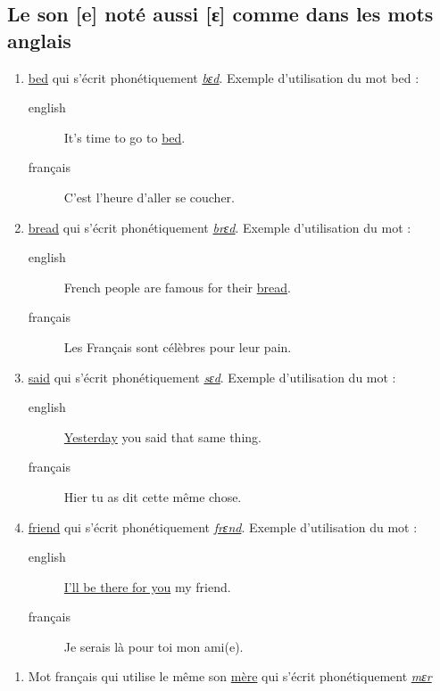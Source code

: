 \subsection{Le son [e] noté aussi [ɛ] comme dans les mots anglais}
\label{sec:orgd503395}
\begin{enumerate}
\item \href{http://www.wordreference.com/enfr/bed}{bed} qui s'écrit phonétiquement \href{https://en.oxforddictionaries.com/definition/bed}{\emph{bɛd}}. Exemple d'utilisation du mot bed :
\begin{description}
\item[{english}] \textenglish{It's time to go to \href{https://youtu.be/urARKkLo6MY}{bed}.}
\item[{français}] C'est l'heure d'aller se coucher.
\end{description}
\item \href{http://www.wordreference.com/enfr/bread}{bread} qui s'écrit phonétiquement \href{https://en.oxforddictionaries.com/definition/bread}{\emph{brɛd}}. Exemple d'utilisation du
mot :
\begin{description}
\item[{english}] \textenglish{French people are famous for their \href{https://youtu.be/Ynm9Wrznz4I}{bread}.}
\item[{français}] Les Français sont célèbres pour leur pain.
\end{description}
\item \href{http://www.wordreference.com/enfr/said}{said} qui s'écrit phonétiquement \href{https://en.oxforddictionaries.com/definition/said}{\emph{sɛd}}. Exemple d'utilisation du mot :
\begin{description}
\item[{english}] \textenglish{\href{https://www.azlyrics.com/lyrics/beatles/yesterday.html}{Yesterday} you said that same thing.}
\item[{français}] Hier tu as dit cette même chose.
\end{description}
\item \href{http://www.wordreference.com/enfr/friend}{friend} qui s'écrit phonétiquement \href{https://en.oxforddictionaries.com/definition/friend}{\emph{frɛnd}}. Exemple d'utilisation du mot :
\begin{description}
\item[{english}] \textenglish{\href{https://youtu.be/q-9kPks0IfE}{I'll be there for you} my friend.}
\item[{français}] Je serais là pour toi mon ami(e).
\end{description}
\end{enumerate}
\begin{enumerate}
\item Mot français qui utilise le même son
\label{sec:org74483b7}
\href{http://www.wordreference.com/fren/m\%25C3\%25A8re}{mère} qui s'écrit phonétiquement \href{http://www.larousse.fr/dictionnaires/francais-anglais/m\%25c3\%25a8re/50499}{\emph{mεr}}
\end{enumerate}
